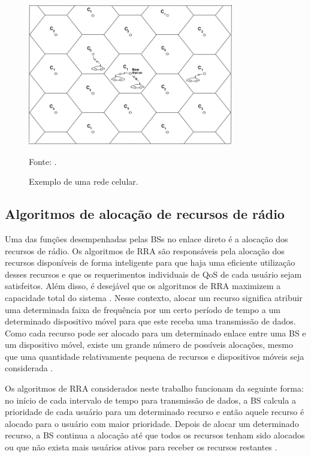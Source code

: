 \begin{figure}[ht]
	\centering	
	
	\caption[Exemplo de uma rede celular]{Exemplo de uma rede celular.}
	\includegraphics[width=0.8\textwidth]{figs/SistemaCelular.png}
	
	{Fonte: \cite{goldsmith2005wireless}.}
	\label{fig:Cells}
\end{figure}

\subsection{Algoritmos de alocação de recursos de rádio}

Uma das funções desempenhadas pelas BSs no enlace direto é a alocação dos recursos de rádio. Os algoritmos de RRA são responsáveis pela alocação dos recursos disponíveis de forma inteligente para que haja uma eficiente utilização desses recursos e que os requerimentos individuais de QoS de cada usuário sejam satisfeitos. Além disso, é desejável que os algoritmos de RRA maximizem a capacidade total do sistema \cite{gotsis2014radio}. Nesse contexto, alocar um recurso significa atribuir uma determinada faixa de frequência por um certo período de tempo a um determinado dispositivo móvel para que este receba uma transmissão de dados. Como cada recurso pode ser alocado para um determinado enlace entre uma BS e um dispositivo móvel, existe um grande número de possíveis alocações, mesmo que uma quantidade relativamente pequena de recursos e dispositivos móveis seja considerada \cite{maciel2010performance}.

Os algoritmos de RRA considerados neste trabalho funcionam da seguinte forma: no início de cada intervalo de tempo para transmissão de dados, a BS calcula a prioridade de cada usuário para um determinado recurso e então aquele recurso é alocado para o usuário com maior prioridade. Depois de alocar um determinado recurso, a BS continua a alocação até que todos os recursos tenham sido alocados ou que não exista mais usuários ativos para receber os recursos restantes \cite{Proc:Lei2007}.

